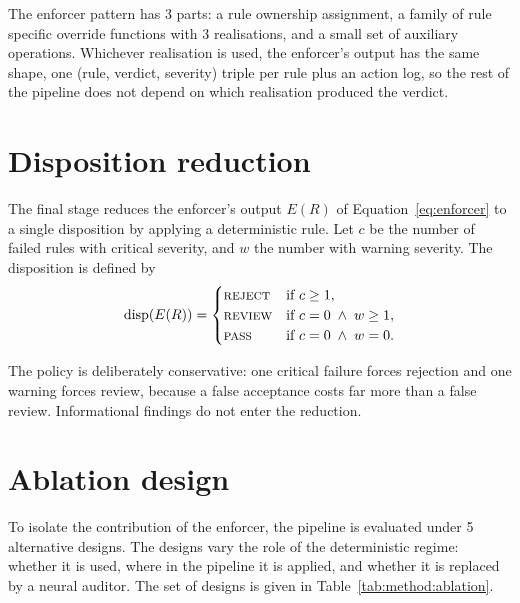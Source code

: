 The enforcer pattern has 3 parts: a rule ownership assignment, a family of rule specific override functions with 3 realisations, and a small set of auxiliary operations. Whichever realisation is used, the enforcer's output has the same shape, one (rule, verdict, severity) triple per rule plus an action log, so the rest of the pipeline does not depend on which realisation produced the verdict.


\section{Disposition reduction}
\label{sec:method:disposition}

The final stage reduces the enforcer's output $E(R)$ of Equation~\eqref{eq:enforcer} to a single disposition by applying a deterministic rule. Let $c$ be the number of failed rules with critical severity, and $w$ the number with warning severity. The disposition is defined by
%
\begin{equation}\label{eq:disposition}
  \text{disp}(E(R)) =
  \begin{cases}
    \textsc{reject} & \text{if } c \geq 1, \\
    \textsc{review} & \text{if } c = 0 \;\wedge\; w \geq 1, \\
    \textsc{pass}   & \text{if } c = 0 \;\wedge\; w = 0.
  \end{cases}
\end{equation}

The policy is deliberately conservative: one critical failure forces rejection and one warning forces review, because a false acceptance costs far more than a false review. Informational findings do not enter the reduction.


\section{Ablation design}
\label{sec:method:ablation}

To isolate the contribution of the enforcer, the pipeline is evaluated under 5 alternative designs. The designs vary the role of the deterministic regime: whether it is used, where in the pipeline it is applied, and whether it is replaced by a neural auditor. The set of designs is given in Table~\ref{tab:method:ablation}.

